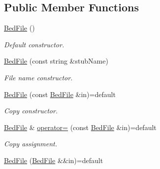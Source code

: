 \subsection*{Public Member Functions}
\begin{DoxyCompactItemize}
\item 
\mbox{\label{classsamp_files_1_1_bed_file_a0853371d06c87876859d5cf3c711c8e3}} 
\hyperlink{classsamp_files_1_1_bed_file_a0853371d06c87876859d5cf3c711c8e3}{Bed\+File} ()
\begin{DoxyCompactList}\small\item\em Default constructor. \end{DoxyCompactList}\item 
\hyperlink{classsamp_files_1_1_bed_file_a69631d96080c22e686e8acb75cf2cc89}{Bed\+File} (const string \&stub\+Name)
\begin{DoxyCompactList}\small\item\em File name constructor. \end{DoxyCompactList}\item 
\mbox{\label{classsamp_files_1_1_bed_file_a77703bfb5a3a3392e71514a41c5bde1c}} 
\hyperlink{classsamp_files_1_1_bed_file_a77703bfb5a3a3392e71514a41c5bde1c}{Bed\+File} (const \hyperlink{classsamp_files_1_1_bed_file}{Bed\+File} \&in)=default
\begin{DoxyCompactList}\small\item\em Copy constructor. \end{DoxyCompactList}\item 
\mbox{\label{classsamp_files_1_1_bed_file_ad2f3aa3c098034139fa371f65dadfd50}} 
\hyperlink{classsamp_files_1_1_bed_file}{Bed\+File} \& \hyperlink{classsamp_files_1_1_bed_file_ad2f3aa3c098034139fa371f65dadfd50}{operator=} (const \hyperlink{classsamp_files_1_1_bed_file}{Bed\+File} \&in)=default
\begin{DoxyCompactList}\small\item\em Copy assignment. \end{DoxyCompactList}\item 
\mbox{\label{classsamp_files_1_1_bed_file_a615dcf39c6d51a5ff40df4631873b5ab}} 
\hyperlink{classsamp_files_1_1_bed_file_a615dcf39c6d51a5ff40df4631873b5ab}{Bed\+File} (\hyperlink{classsamp_files_1_1_bed_file}{Bed\+File} \&\&in)=default

\end{DoxyCompactItemize}
